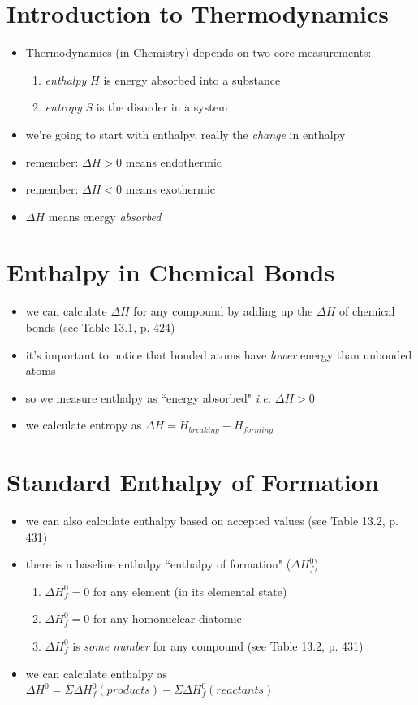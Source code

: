 \documentclass[10pt, oneside]{article}   	%
\begin{document}
\section*{Introduction to Thermodynamics}

\begin{itemize}
\item Thermodynamics (in Chemistry) depends on two core measurements:
\begin{enumerate}
\item \emph{enthalpy} $H$ is energy absorbed into a substance
\item \emph{entropy} $S$ is the disorder in a system
\end{enumerate}
\item we're going to start with enthalpy, really the \emph{change} in enthalpy
\item remember: $\Delta H > 0$ means endothermic
\item remember: $\Delta H < 0$ means exothermic
\item $\Delta H$ means energy \emph{absorbed}
\end{itemize}

\section*{Enthalpy in Chemical Bonds}
\begin{itemize}
\item we can calculate $\Delta H$ for any compound by adding up the $\Delta H$ of chemical bonds (see Table 13.1, p. 424)
\item it's important to notice that bonded atoms have \emph{lower} energy than unbonded atoms
\item so we measure enthalpy as ``energy absorbed" \emph{i.e.} $\Delta H > 0$
\item we calculate entropy as $\Delta H = H_{breaking} - H_{forming}$
\end{itemize}

\section*{Standard Enthalpy of Formation}
\begin{itemize}
\item we can also calculate enthalpy based on accepted values (see Table 13.2, p. 431)
\item there is a baseline enthalpy ``enthalpy of formation" ($\Delta H_{f}^{0}$)
\begin{enumerate}
\item $\Delta H_{f}^{0} = 0$ for any element (in its elemental state)
\item $\Delta H_{f}^{0} = 0$ for any homonuclear diatomic
\item $\Delta H_{f}^{0} $ is \emph{some number} for any compound (see Table 13.2, p. 431)
\end{enumerate}
\item we can calculate enthalpy as $\Delta H^{0} = \Sigma \Delta H_{f} ^{0} (products) - \Sigma \Delta H_{f} ^{0} (reactants)$ 
\end{itemize}
\end{document}
